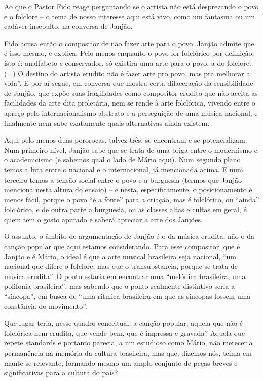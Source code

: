 Ao que o Pastor Fido reage perguntando se o artista não está desprezando
o povo e o folclore -- o tema de nosso interesse aqui está vivo, como um
fantasma ou um cadáver insepulto, na conversa de Janjão.

Fido acusa então o compositor de não fazer arte para o povo. Janjão
admite que é isso mesmo, e explica: Pelo menos enquanto o povo for
folclórico por definição, isto é: analfabeto e conservador, só existira
uma arte para o povo, a do folclore. (...) O destino do artista erudito
não é fazer arte pro povo, mas pra melhorar a vida''. E por aí segue, em
conversa que mostra certa dilaceração da sensibilidade de Janjão, que
expõe suas fragilidades como compositor erudito que não aceita as
facilidades da arte dita proletária, nem se rende à arte folclórica,
vivendo entre o apreço pelo internacionalismo abstrato e a perseguição
de uma música nacional, e finalmente nem sabe exatamente quais
alternativas ainda existem.

Aqui pelo menos duas pororocas, talvez três, se encontram e se
potencializam. Num primeiro nível, Janjão sabe que se trata de uma briga
entre o modernismo e o academicismo (e sabemos qual o lado de Mário
aqui). Num segundo plano temos a luta entre o nacional e o
internacional, já mencionada acima. E num terceiro temos a tensão social
entre o povo e a burguesia (termos que Janjão menciona nesta altura do
ensaio) -- e nesta, especificamente, o posicionamento é menos fácil,
porque o povo ``é a fonte'' para a criação, mas é folclórico, ou
``ainda'' folclórico, e de outra parte a burguesia, ou as classes altas
e cultas em geral, é quem tem o gosto apurado e saberá apreciar a arte
dos Janjões.

O assunto, o âmbito de argumentação de Janjão é o da música erudita, não
o da canção popular que aqui estamos considerando. Para esse compositor,
que é Janjão e é Mário, o ideal é que a arte musical brasileira seja
nacional, ``um nacional que difere o folclore, mas que o transubstancia,
porque se trata de música erudita''. O ponto estaria em encontrar uma
``melódica brasileira, uma polifonia brasileira'', mas sabendo que o
ponto realmente distintivo seria a ``síncopa'', em busca de ``uma
rítmica brasileira em que as síncopas fossem uma constância do
movimento''.

Que lugar teria, nesse quadro conceitual, a canção popular, aquela que
não é folclórica nem erudita, que vende bem, que é impressa e gravada?
Aquela que repete standards e portanto parecia, a um estudioso como
Mário, não merecer a permanência na memória da cultura brasileira, mas
que, dizemos nós, teima em mante-se relevante, formando mesmo um amplo
conjunto de peças breves e significativas para a cultura do país?


